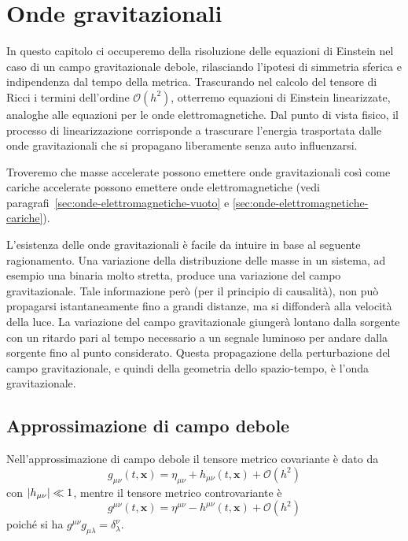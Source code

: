 \chapter{Onde gravitazionali}
\label{cha:onde-grav}

In questo capitolo ci occuperemo della risoluzione delle equazioni di Einstein
nel caso di un campo gravitazionale debole, rilasciando l'ipotesi di simmetria
sferica e indipendenza dal tempo della metrica.  Trascurando nel calcolo del
tensore di Ricci i termini dell'ordine $\mathcal{O}(h^2)$, otterremo equazioni
di Einstein linearizzate, analoghe alle equazioni per le onde elettromagnetiche.
Dal punto di vista fisico, il processo di linearizzazione corrisponde a
trascurare l'energia trasportata dalle onde gravitazionali che si propagano
liberamente senza auto influenzarsi.

Troveremo che masse accelerate possono emettere onde gravitazionali così come
cariche accelerate possono emettere onde elettromagnetiche (vedi
paragrafi~\ref{sec:onde-elettromagnetiche-vuoto} e
\ref{sec:onde-elettromagnetiche-cariche}).

L'esistenza delle onde gravitazionali è facile da intuire in base al seguente
ragionamento.  Una variazione della distribuzione delle masse in un sistema, ad
esempio una binaria molto stretta, produce una variazione del campo
gravitazionale.  Tale informazione però (per il principio di causalità), non può
propagarsi istantaneamente fino a grandi distanze, ma si diffonderà alla
velocità della luce.  La variazione del campo gravitazionale giungerà lontano
dalla sorgente con un ritardo pari al tempo necessario a un segnale luminoso per
andare dalla sorgente fino al punto considerato.  Questa propagazione della
perturbazione del campo gravitazionale, e quindi della geometria dello
spazio-tempo, è l'onda gravitazionale.

\section{Approssimazione di campo debole}
\label{sec:approx-campodebole}

Nell'approssimazione di campo debole il tensore metrico covariante è dato da
\begin{equation}
  g_{\mu \nu}(t, \bm{x}) = \eta_{\mu \nu} + h_{\mu \nu}(t, \bm{x}) +
  \mathcal{O}(h^2)
  \label{metrica_contro}
\end{equation}
con $\lvert h_{\mu\nu}\rvert \ll 1$, mentre il tensore metrico controvariante è
\begin{equation}
  g^{\mu\nu}(t, \bm{x}) = \eta^{\mu\nu} - h^{\mu\nu}(t, \bm{x}) +
  \mathcal{O}(h^2)
\end{equation}
poiché si ha $g^{\mu\nu} g_{\mu\lambda} = \delta^{\nu}_{\lambda}$.

